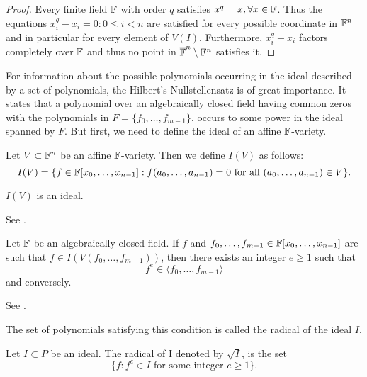 \begin{proof}
Every finite field $\mathbb{F}$ with order $q$ satisfies $x^q = x, \forall x \in \mathbb{F}$. Thus the equations $x_i^q - x_i = 0 : 0 \leq  i < n$ are
satisfied for every possible coordinate in $\mathbb{F}^n$ and in particular for every element of $V(I)$. Furthermore, $x_i^q - x_i$ factors completely over $\mathbb{F}$ and thus no point in $\overline{\mathbb{F}}^n \setminus \mathbb{F}^n$ satisfies it.
\end{proof}

For information about the possible polynomials occurring in the ideal described by a set of polynomials, the Hilbert's Nullstellensatz is of great importance. It states that a polynomial over an algebraically closed field having common zeros with the polynomials in $F = \{f_0 , \dots , f_{m-1} \}$, occurs to some power in the ideal spanned by $F$. But first, we need to define the ideal of an affine $\mathbb{F}$-variety.

\begin{definition} Let $V \subset \mathbb{F}^n$ be an affine $\mathbb{F}$-variety. Then we define $I(V)$ as follows:
\[I(V) = \{f \in \mathbb{F}[x_0,\dots,x_{n-1}] : f(a_0,\dots,a_{n-1}) = 0 \textnormal{ for all } (a_0,\dots,a_{n-1}) \in V\}.\]
\end{definition}

\begin{lemma}
$I(V)$ is an ideal.
\end{lemma}

\begin{citeproof}
See \cite[p.31ff]{Cox2005}.
\end{citeproof}

\begin{theorem} Let $\mathbb{F}$ be an algebraically closed field. If $f$ and $f_0 , \dots , f_{m-1}
\in \mathbb{F}[x_0,\dots,x_{n-1}]$ are such that $f \in I(V(f_0 , \dots , f_{m-1} ))$, then there exists an
integer $e \geq 1$ such that
\[
f^e \in \langle f_0 , \dots , f_{m-1} \rangle
\]
and conversely.
\end{theorem}

\begin{citeproof}
See \cite[p.171]{Cox2005}.
\end{citeproof}

The set of polynomials satisfying this condition is called the radical of the ideal $I$.

\begin{definition}
Let $I \subset P$ be an ideal. The radical of I denoted by $\sqrt{I}$, is
the set
\[
                                 \{f : f^e \in I \textrm{ for some integer } e ≥ 1\} .
\]
\end{definition}

